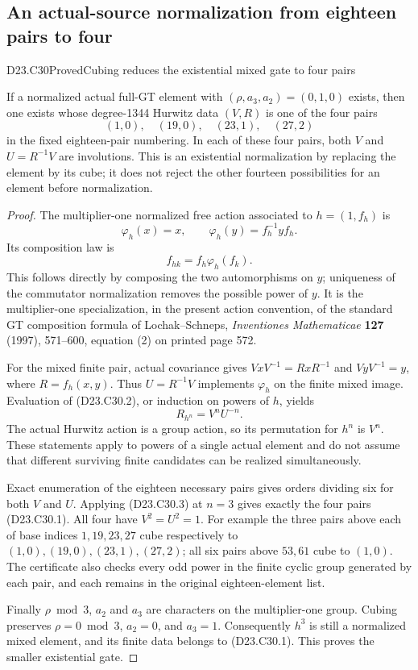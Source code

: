 \subsection{An actual-source normalization from eighteen pairs to four}

\begin{statement}{D23.C30}{Proved}{Cubing reduces the existential mixed gate to four pairs}
\end{statement}
If a normalized actual full-GT element with
$(\rho,a_3,a_2)=(0,1,0)$ exists, then one exists whose
degree-1344 Hurwitz data $(V,R)$ is one of the four pairs
\[
                        (1,0),\quad(19,0),\quad(23,1),\quad(27,2)
                                                               \tag{D23.C30.1}
\]
in the fixed eighteen-pair numbering.  In each of these
four pairs, both $V$ and $U=R^{-1}V$ are involutions.
This is an existential normalization by replacing the
element by its cube; it does not reject the other
fourteen possibilities for an element before normalization.

\begin{proof}
The multiplier-one normalized free action associated to
$h=(1,f_h)$ is
\[
            \varphi_h(x)=x,\qquad
            \varphi_h(y)=f_h^{-1}y f_h.
\]
Its composition law is
\[
              f_{hk}=f_h\varphi_h(f_k).                   \tag{D23.C30.2}
\]
This follows directly by composing the two automorphisms
on $y$; uniqueness of the commutator normalization removes
the possible power of $y$.  It is the multiplier-one
specialization, in the present action convention, of the
standard GT composition formula of Lochak--Schneps,
\emph{Inventiones Mathematicae} \textbf{127} (1997),
571--600, equation (2) on printed page 572.

For the mixed finite pair, actual covariance gives
$VxV^{-1}=RxR^{-1}$ and $VyV^{-1}=y$, where $R=f_h(x,y)$.
Thus $U=R^{-1}V$ implements $\varphi_h$ on the finite
mixed image.  Evaluation of (D23.C30.2), or induction on
powers of $h$, yields
\[
                    R_{h^n}=V^nU^{-n}.                    \tag{D23.C30.3}
\]
The actual Hurwitz action is a group action, so its
permutation for $h^n$ is $V^n$.  These statements apply
to powers of a single actual element and do not assume
that different surviving finite candidates can be
realized simultaneously.

Exact enumeration of the eighteen necessary pairs gives
orders dividing six for both $V$ and $U$.  Applying
(D23.C30.3) at $n=3$ gives exactly the four pairs
(D23.C30.1).  All four have $V^2=U^2=1$.
For example the three pairs above each of base indices
$1,19,23,27$ cube respectively to $(1,0),(19,0),(23,1),(27,2)$;
all six pairs above $53,61$ cube to $(1,0)$.
The certificate also checks every odd power in the
finite cyclic group generated by each pair, and each
remains in the original eighteen-element list.

Finally $\rho\bmod3$, $a_2$ and $a_3$ are characters on
the multiplier-one group.  Cubing preserves
$\rho=0\bmod3$, $a_2=0$, and $a_3=1$.
Consequently $h^3$ is still a normalized mixed element,
and its finite data belongs to (D23.C30.1).  This proves
the smaller existential gate.
\end{proof}

